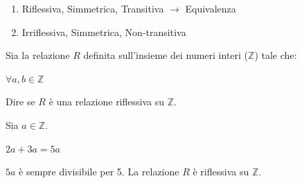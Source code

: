 \begin{soluzione}
\begin{enumerate}

\item Riflessiva, Simmetrica, Transitiva $\rightarrow$ Equivalenza\\


\item Irriflessiva, Simmetrica, Non-transitiva\\


\end{enumerate}

\end{soluzione}










\begin{esercizio}
    Sia la relazione $R$ definita sull'insieme dei numeri interi ($\mathbb{Z}$) tale che: 
	
	\begin{center}
		 $\forall a,b \in \mathbb{Z}$
	\end{center}
	
	\noindent 
	Dire se $R$ è una relazione riflessiva su $\mathbb{Z}$. 
	
\end{esercizio}


\begin{soluzione}
    	
	Sia $a \in \mathbb{Z}$. 
	
	$2a + 3a = 5a$
	
	\noindent $5a$ è sempre divisibile per 5. La relazione $R$ è riflessiva su $\mathbb{Z}$. 
	\bigskip
    
    \vspace{0.10cm}
\end{soluzione}


